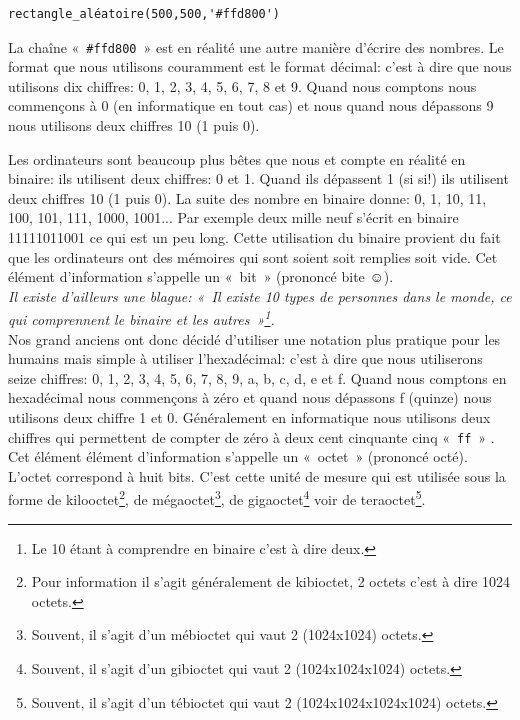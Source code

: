 \begin{Verbatim}[frame=single,rulecolor=\color{mbleu}, label=à taper]
rectangle_aléatoire(500,500,'#ffd800')
\end{Verbatim}

La chaîne «~\texttt{\#ffd800}~» est en réalité une autre manière d'écrire des nombres.
Le format que nous utilisons couramment est le format décimal: c'est à dire que nous utilisons dix chiffres: 0, 1, 2, 3, 4, 5, 6, 7, 8 et 9. Quand nous comptons nous commençons à 0 (en informatique en tout cas) et nous quand nous dépassons 9 nous utilisons deux chiffres 10 (1 puis 0).

Les ordinateurs sont beaucoup plus bêtes que nous et compte en réalité en binaire: ils utilisent deux chiffres: 0 et 1. Quand ils dépassent 1 (si si!) ils utilisent deux chiffres 10 (1 puis 0). La suite des nombre en binaire donne: 0, 1, 10, 11, 100, 101, 111, 1000, 1001... Par exemple deux mille neuf s'écrit en binaire 11111011001 ce qui est un peu long. Cette utilisation du binaire provient du fait que les ordinateurs ont des mémoires qui sont soient soit remplies soit vide. Cet élément d'information s'appelle un «~bit~» (prononcé bite ☺).\\

\emph{Il existe d'ailleurs une blague: «~Il existe \emph{10} types de personnes dans le monde, ce qui comprennent le binaire et les autres~»\footnote{Le 10 étant à comprendre en binaire c'est à dire deux.}.}\\


Nos grand anciens ont donc décidé d'utiliser une notation plus pratique pour les humains mais simple à utiliser l'hexadécimal: c'est à dire que nous utiliserons seize chiffres: 0, 1, 2, 3, 4, 5, 6, 7, 8, 9, a, b, c, d, e et f. Quand nous comptons en hexadécimal nous commençons à zéro et quand nous dépassons f (quinze) nous utilisons deux chiffre 1 et 0. Généralement en informatique nous utilisons deux chiffres qui permettent de compter de zéro à deux cent cinquante cinq «~\texttt{ff}~» .
Cet élément élément d'information s'appelle un «~octet~» (prononcé octé). L'octet correspond à huit bits. C'est cette unité de mesure qui est utilisée sous la forme de kilooctet\footnote{Pour information il s'agit généralement de kibioctet, 2 octets c'est à dire 1024 octets.}, de mégaoctet\footnote{Souvent, il s'agit d'un mébioctet qui vaut 2 (1024\textsf{x}1024) octets.}, de gigaoctet\footnote{Souvent, il s'agit d'un gibioctet qui vaut 2 (1024\textsf{x}1024\textsf{x}1024) octets.} voir de teraoctet\footnote{Souvent, il s'agit d'un tébioctet qui vaut 2 (1024\textsf{x}1024\textsf{x}1024\textsf{x}1024) octets.}.

